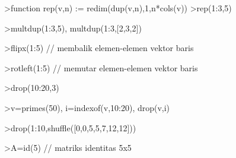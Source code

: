 \documentclass[a4paper,11pt,oneside,enabledeprecatedfontcommands]{scrbook}
\newenvironment{eulernotebook}{}{}
\begin{document}
\begin{eulernotebook}
\begin{eulerprompt}
>function rep(v,n) := redim(dup(v,n),1,n*cols(v))
>rep(1:3,5)
\end{eulerprompt}
\begin{euleroutput}
[1,  2,  3,  1,  2,  3,  1,  2,  3,  1,  2,  3,  1,  2,  3]
\end{euleroutput}
\begin{eulerprompt}
>multdup(1:3,5), multdup(1:3,[2,3,2])
\end{eulerprompt}
\begin{euleroutput}
[1,  1,  1,  1,  1,  2,  2,  2,  2,  2,  3,  3,  3,  3,  3]
[1,  1,  2,  2,  2,  3,  3]
\end{euleroutput}
\begin{eulerprompt}
>flipx(1:5) // membalik elemen-elemen vektor baris
\end{eulerprompt}
\begin{euleroutput}
[5,  4,  3,  2,  1]
\end{euleroutput}
\begin{eulerprompt}
>rotleft(1:5) // memutar elemen-elemen vektor baris
\end{eulerprompt}
\begin{euleroutput}
[2,  3,  4,  5,  1]
\end{euleroutput}
\begin{eulerprompt}
>drop(10:20,3)
\end{eulerprompt}
\begin{euleroutput}
[10,  11,  13,  14,  15,  16,  17,  18,  19,  20]
\end{euleroutput}
\begin{eulerprompt}
>v=primes(50), i=indexof(v,10:20), drop(v,i)
\end{eulerprompt}
\begin{euleroutput}
[2,  3,  5,  7,  11,  13,  17,  19,  23,  29,  31,  37,  41,  43,  47]
[0,  5,  0,  6,  0,  0,  0,  7,  0,  8,  0]
[2,  3,  5,  7,  23,  29,  31,  37,  41,  43,  47]
\end{euleroutput}
\begin{eulerprompt}
>drop(1:10,shuffle([0,0,5,5,7,12,12]))
\end{eulerprompt}
\begin{euleroutput}
[1,  2,  3,  4,  6,  8,  9,  10]
\end{euleroutput}
\begin{eulerprompt}
>A=id(5) // matriks identitas 5x5
\end{eulerprompt}
\begin{euleroutput}

\end{euleroutput}
\end{eulernotebook}
\end{document}
